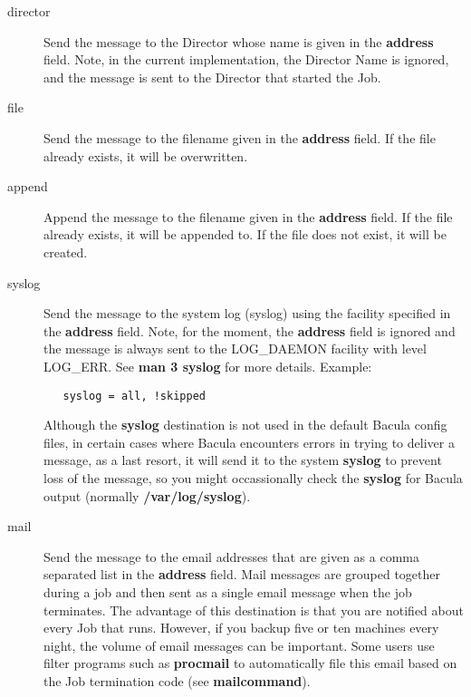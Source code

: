 \begin{description}
\begin{description}
\item [director]
   Send the message to the Director whose name  is given in the {\bf address}
   field. Note, in the current  implementation, the Director Name is ignored, and
   the message  is sent to the Director that started the Job.  

\item [file]
   Send the message to the filename given in  the {\bf address} field. If the
   file already exists, it will be  overwritten.  

\item [append]
   Append the message to the filename given  in the {\bf address} field. If the
   file already exists, it will  be appended to. If the file does not exist, it
   will be created.  

\item [syslog]
   Send the message to the system log (syslog)  using the facility specified in
   the {\bf address} field.  Note, for the moment, the {\bf address} field is
   ignored  and the message is always sent to the LOG\_DAEMON facility with
   level LOG\_ERR. See {\bf man 3 syslog} for more details. Example:

\begin{verbatim}
   syslog = all, !skipped
\end{verbatim}

   Although the {\bf syslog} destination is not used in the default Bacula
   config files, in certain cases where Bacula encounters errors in trying
   to deliver a message, as a last resort, it will send it to the system
   {\bf syslog} to prevent loss of the message, so you might occassionally
   check the {\bf syslog} for Bacula output (normally {\bf
   /var/log/syslog}).

\item [mail]
   Send the message to the email addresses that are given as a comma
   separated list in the {\bf address} field.  Mail messages are grouped
   together during a job and then sent as a single email message when the
   job terminates.  The advantage of this destination is that you are
   notified about every Job that runs.  However, if you backup five or ten
   machines every night, the volume of email messages can be important.
   Some users use filter programs such as {\bf procmail} to automatically
   file this email based on the Job termination code (see {\bf
   mailcommand}).


\end{description}
\end{description}
